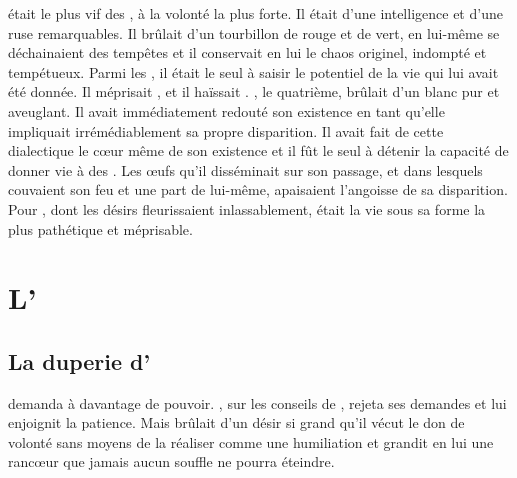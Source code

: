 \Ogo était le plus vif des \Dormus, à la volonté la plus forte. Il était d'une intelligence et d'une ruse remarquables. Il brûlait d'un tourbillon de rouge et de vert, en lui-même se déchainaient des tempêtes et il conservait en lui le chaos originel, indompté et tempétueux. Parmi les \Dormus, il était le seul à saisir le potentiel de la vie qui lui avait été donnée. Il méprisait \Boromu, et il haïssait \Tot. \Tot, le quatrième, brûlait d'un blanc pur et aveuglant. Il avait immédiatement redouté son existence en tant qu'elle impliquait irrémédiablement sa propre disparition. Il avait fait de cette dialectique le cœur même de son existence et il fût le seul à détenir la capacité de donner vie à des \SC. Les œufs qu'il disséminait sur son passage, et dans lesquels couvaient son feu et une part de lui-même, apaisaient l'angoisse de sa disparition. Pour \Ogo, dont les désirs fleurissaient inlassablement, \Tot
était la vie sous sa forme la plus pathétique et méprisable. 


\section{L'\Extinction}

\subsection{La duperie d'\Ogo}
 \Ogo demanda à \Mey davantage de pouvoir. \Mey, sur les conseils de \Cind, rejeta ses demandes et lui enjoignit la patience. Mais \Ogo brûlait d'un désir si grand qu'il vécut le don de volonté sans moyens de la réaliser comme une humiliation et grandit en lui une rancœur que jamais aucun souffle ne pourra éteindre.  
 
